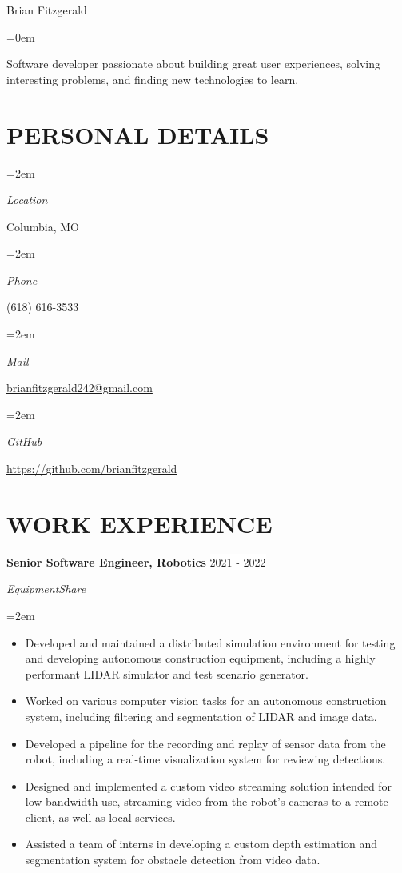 \documentclass[paper=a4,fontsize=9pt]{scrartcl} %
\newlength{\spacebox}
\newcommand{\sepspace}{\vspace*{0.8em}}		%
\newcommand{\MyName}[1]{ %
			\Huge \usefont{OT1}{phv}{b}{n} \hfill #1
			\par \normalsize \normalfont}
\newcommand{\NewPart}[1]{\section*{\uppercase{#1}}}
\newcommand{\PersonalEntry}[2]{
			\noindent\hangindent=2em\hangafter=0 %
			\parbox{\spacebox}{        %
			\textit{#1}}		       %
			\hspace{1.5em} #2 \par}    %
\newcommand{\PersonalStatement}[2]{
			\noindent\hangindent=0em\hangafter=0 %
			\parbox{\spacebox}{        %
			\textit{#1}}		       %
			\hspace{-5.5em} #2 \par}    %
\newcommand{\EducationEntry}[4]{
			\noindent \textbf{#1} \hfill      %
			\colorbox{Black}{%
				\parbox{6em}{%
				\hfill\color{White}#2}} \par  %
			\noindent \textit{#3} \par        %
			\noindent\hangindent=2em\hangafter=0 \small #4 %
			\normalsize \par}
\newcommand{\WorkEntry}[4]{				  %
			\noindent \textbf{#1} \hfill      %
			\colorbox{White}{\color{Black}#2} \par  %
			\noindent \textit{#3} \par              %
			\noindent\hangindent=2em\hangafter=0 \small #4 %
			\normalsize \par}
\begin{document}
	
	\MyName{Brian Fitzgerald}
	
	\sepspace

	\PersonalStatement{}{Software developer passionate about building great user experiences, solving interesting problems, and finding new technologies to learn.}

	
	\NewPart{Personal details}{}
	
	\PersonalEntry{Location}{Columbia, MO}
	\PersonalEntry{Phone}{(618) 616-3533}
	\PersonalEntry{Mail}{\url{brianfitzgerald242@gmail.com}}
	\PersonalEntry{GitHub}{\url{https://github.com/brianfitzgerald}}
	
	\NewPart{Work experience}{}

	\WorkEntry{Senior Software Engineer, Robotics}{2021 - 2022}{EquipmentShare}{
		\begin{itemize}
			\item Developed and maintained a distributed simulation environment for testing and developing autonomous construction equipment, including a highly performant LIDAR simulator and test scenario generator.
			\item Worked on various computer vision tasks for an autonomous construction system, including filtering and segmentation of LIDAR and image data.
			\item Developed a pipeline for the recording and replay of sensor data from the robot, including a real-time visualization system for reviewing detections.
			\item Designed and implemented a custom video streaming solution intended for low-bandwidth use, streaming video from the robot's cameras to a remote client, as well as local services.
			\item Assisted a team of interns in developing a custom depth estimation and segmentation system for obstacle detection from video data.
		\end{itemize}
	}
	\sepspace
\end{document}
